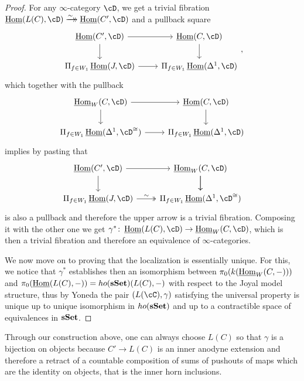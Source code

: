 \begin{proof}
  \noindent
  For any $\infty$-category $\cD$, we get a trivial fibration
  $\home(L(C),\cD)\dhxrightarrow{\sim}\home(C',\cD)$ and a pullback square
  \[\begin{tikzcd}
    {\home(C',\cD)} & {\home(C,\cD)} \\
    {\Pi_{f\in W_1}\home(J,\cD)} & {\Pi_{f\in W_1}\home(\Delta^1,\cD)}
    \arrow[from=1-2, to=2-2]
    \arrow[from=2-1, to=2-2]
    \arrow[from=1-1, to=2-1]
    \arrow[from=1-1, to=1-2]
  \end{tikzcd},\]
  which together with the pullback
  \[\begin{tikzcd}
    {\home_W(C,\cD)} & {\home(C,\cD)} \\
    {\Pi_{f\in W_1}\home(\Delta^1,\cD^{\cong})} & {\Pi_{f\in W_1}\home(\Delta^1,\cD)}
    \arrow[from=1-2, to=2-2]
    \arrow[from=2-1, to=2-2]
    \arrow[from=1-1, to=2-1]
    \arrow[from=1-1, to=1-2]
  \end{tikzcd}\]
  implies by pasting that
  \[\begin{tikzcd}
    {\home(C',\cD)} & {\home_W(C,\cD)} \\
    {\Pi_{f\in W_1}\home(J,\cD)} & {\Pi_{f\in W_1}\home(\Delta^1,\cD^{\cong})}
    \arrow[from=1-2, to=2-2]
    \arrow[from=1-1, to=1-2]
    \arrow[from=1-1, to=2-1]
    \arrow["\sim", two heads, from=2-1, to=2-2]
    \arrow[from=1-2, to=2-2]
  \end{tikzcd}\]
  is also a pullback and therefore the upper arrow is a trivial fibration.
  Composing it with the other one we get
  $\gamma^*\colon\home(L(C),\cD)\rightarrow\home_W(C,\cD)$, which is then a
  trivial fibration and therefore an equivalence of $\infty$-categories.

  We now move on to proving that the localization is essentially unique. For
  this, we notice that $\gamma^*$ establishes then an isomorphism between
  $\pi_0(k(\operatorname{\underline{Hom}}_W(C,-)))$ and $\pi_0(\operatorname{\underline{Hom}}(L(C),-))=ho(\operatorname{\mathbf{sSet}})(L(C),-)$
  with respect to the Joyal model structure, thus by Yoneda the pair
  $(L(\cC),\gamma)$ satisfying the universal property is
  unique up to unique isomorphism in $ho(\operatorname{\mathbf{sSet}})$ and up to a contractible space
  of equivalences in $\operatorname{\mathbf{sSet}}$.
\end{proof}

\begin{rmk}\label{714}
  Through our construction above, one can always choose $L(C)$ so that $\gamma$
  is a bijection on objects because $C'\rightarrow L(C)$ is an inner anodyne
  extension and therefore a retract of a countable
  composition of sums of pushouts of maps which are the identity on objects,
  that is the inner horn inclusions.
\end{rmk}

